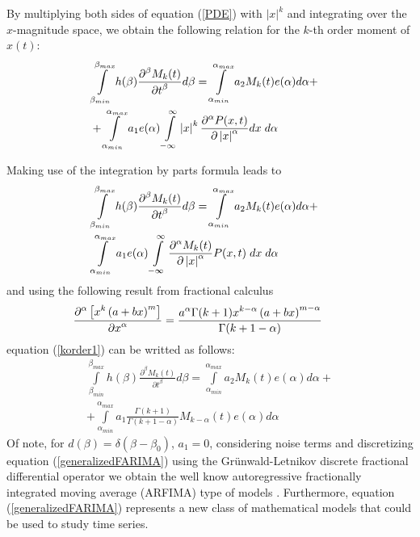 By multiplying both sides of equation (\ref{PDE}) with $\left|x\right|^{k}$ and integrating over the $x$-magnitude space, we obtain the following relation for the $k$-th order moment of $x(t)$:
\begin{eqnarray}
\label{korder1}
&\displaystyle\int\limits_{\beta_{min}}^{\beta_{max}}  h(\beta) \frac{\displaystyle\partial^{\beta}M_{k}(t)}{\displaystyle\partial t^{\beta}} d\beta = \displaystyle\int\limits_{\alpha_{min}}^{\alpha_{max}} a_{2} M_{k}(t) e(\alpha) d\alpha +&\nonumber\\
&  +\displaystyle\int\limits_{\alpha_{min}}^{\alpha_{max}} a_{1}  e(\alpha)  \int\limits_{-\infty}^{\infty}  \left|x\right|^{k} \frac{\displaystyle\partial^{\alpha}P(x,t)}{\displaystyle\partial \left|x\right|^{\alpha}} dx \hspace{1mm} d\alpha &
\end{eqnarray}

Making use of the integration by parts formula leads to
\begin{eqnarray}
& \displaystyle\int\limits_{\beta_{min}}^{\beta_{max}}  h(\beta) \frac{\displaystyle\partial^{\beta} M_{k}(t)}{\displaystyle\partial t^{\beta}} d\beta = \displaystyle\int\limits_{\alpha_{min}}^{\alpha_{max}} a_{2} M_{k}(t) e(\alpha) d\alpha  +&\nonumber\\
& \displaystyle\int\limits_{\alpha_{min}}^{\alpha_{max}} a_{1} e(\alpha) \int\limits_{-\infty}^{\infty} \frac{\displaystyle\partial^{\alpha}M_{k}(t)}{\displaystyle\partial \left|x\right|^{\alpha}} P(x,t) \hspace{1mm} dx \hspace{1mm} d\alpha &
\end{eqnarray}
and using the following result from fractional calculus
\begin{eqnarray}
&\frac{\displaystyle \partial^{\alpha} \left[x^{k}\left(a+bx\right)^{m}\right] }{\displaystyle\partial x^{\alpha}}  = \frac{\displaystyle a^{\alpha}\Gamma(k+1)x^{k-\alpha}\left(a+bx\right)^{m-\alpha}}{\displaystyle\Gamma(k+1-\alpha)}\hspace{4mm}&
\end{eqnarray}
equation (\ref{korder1}) can be writted as follows:
\begin{eqnarray}
\label{generalizedFARIMA}
&\displaystyle\int\limits_{\beta_{min}}^{\beta_{max}}  h(\beta) \frac{\displaystyle\partial^{\beta}M_{k}(t)}{\displaystyle\partial t^{\beta}} d\beta = \displaystyle\int\limits_{\alpha_{min}}^{\alpha_{max}} a_{2} M_{k}(t) e(\alpha) d\alpha  + & \nonumber\\
& +  \displaystyle\int\limits_{\alpha_{min}}^{\alpha_{max}} a_{1}  \frac{\displaystyle\Gamma(k+1) }{\displaystyle\Gamma(k+1-\alpha)} M_{k-\alpha}(t)  e(\alpha)d\alpha &
\end{eqnarray}
Of note, for $d(\beta) = \delta(\beta-\beta_{0})$, $a_{1} = 0$, considering noise terms and discretizing equation (\ref{generalizedFARIMA}) using the Gr\"unwald-Letnikov discrete fractional differential operator \cite{Sabatier2007} we obtain the well know autoregressive fractionally integrated moving average (ARFIMA) type of models \cite{Granger1980}\cite{Hosking1981}. Furthermore, equation (\ref{generalizedFARIMA}) represents a new class of mathematical models that could be used to study time series.

